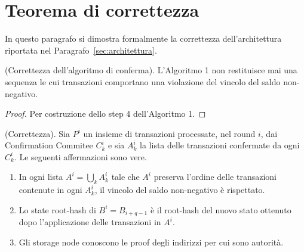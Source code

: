 \section{Teorema di correttezza}

In questo paragrafo si dimostra formalmente la correttezza dell'architettura riportata nel Paragrafo~\ref{sec:architettura}.

\begin{lemma}{(Correttezza dell'algoritmo di conferma).}\label{lemma:cc}
L'Algoritmo 1 non restituisce mai una sequenza le cui transazioni comportano una violazione del vincolo del saldo non-negativo.
\end{lemma}

\begin{proof}
Per costruzione dello step 4 dell'Algoritmo 1.
\end{proof}


\begin{theorem}{(Correttezza).}
Sia $P^i$ un insieme di transazioni processate, nel round $i$, dai Confirmation Commitee $C_k^i$ e sia $A_k^i$ la lista delle transazioni confermate da ogni $C_k^i$. Le seguenti affermazioni sono vere.

\begin{enumerate}
	\item In ogni lista $A^i = \bigcup_k A_k^i$ tale che $A^i$ preserva l'ordine delle transazioni contenute in ogni $A_k^i$, il vincolo del saldo non-negativo è rispettato.
	\item Lo state root-hash di $B^i = B_{i+q-1}$ è il root-hash del nuovo stato ottenuto dopo l'applicazione delle transazioni in $A^i$.
	\item Gli storage node conoscono le proof degli indirizzi per cui sono autorità.
\end{enumerate}

\end{theorem}


